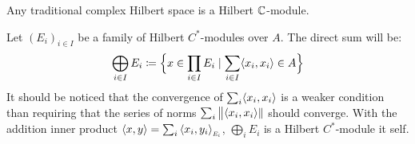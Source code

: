 \begin{exemplos}\label{exemplos de hilbert modules}
    $\left.\right.$
\begin{itroman}
    \item Any traditional complex Hilbert space is a Hilbert $\operatorname{\mathbb{C}}$-module.    
    \item \label{item: soma direta de modulos de hilbert} Let $(E_i)_{i\in I}$ be a family of Hilbert $C^*$-modules over $A$. The direct sum will be:
    \[
    \bigoplus_{i\in I}E_i \coloneqq \Big\{x \in \prod_{i\in I} E_i \mid \sum_{i\in I} \langle {x_i},{x_i}\rangle \in A\Big\}
    \]
    It should be noticed that the convergence of $\sum_i \langle {x_i},{x_i}\rangle$ is a weaker condition than requiring that the series of norms $\sum_i \big\|\langle {x_i},{x_i}\rangle\|$ should converge. With the addition inner product $\inner xy = \sum_{i} \sub{\inner{x_i}{y_i}}{E_i}$, $\bigoplus_{i} E_i$ is a Hilbert $C^*$-module it self.
        

\end{itroman}
\end{exemplos}
